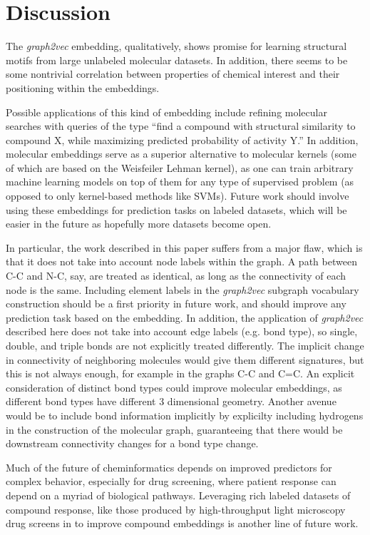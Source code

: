 \section{Discussion}

The \textit{graph2vec} embedding, qualitatively, shows promise for learning structural motifs from large unlabeled molecular datasets. In addition, there seems to be some nontrivial correlation between properties of chemical interest and their positioning within the embeddings.

Possible applications of this kind of embedding include refining molecular searches with queries of the type ``find a compound with structural similarity to compound X, while maximizing predicted probability of activity Y.'' In addition, molecular embeddings serve as a superior alternative to molecular kernels (some of which are based on the Weisfeiler Lehman kernel), as one can train arbitrary machine learning models on top of them for any type of supervised problem (as opposed to only kernel-based methods like SVMs). Future work should involve using these embeddings for prediction tasks on labeled datasets, which will be easier in the future as hopefully more datasets become open.

In particular, the work described in this paper suffers from a major flaw, which is that it does not take into account node labels within the graph. A path between C-C and N-C, say, are treated as identical, as long as the connectivity of each node is the same. Including element labels in the \textit{graph2vec} subgraph vocabulary construction should be a first priority in future work, and should improve any prediction task based on the embedding. In addition, the application of \textit{graph2vec} described here does not take into account edge labels (e.g. bond type), so single, double, and triple bonds are not explicitly treated differently. The implicit change in connectivity of neighboring molecules would give them different signatures, but this is not always enough, for example in the graphs C-C and C=C. An explicit consideration of distinct bond types could improve molecular embeddings, as different bond types have different 3 dimensional geometry. Another avenue would be to include bond information implicitly by explicilty including hydrogens in the construction of the molecular graph, guaranteeing that there would be downstream connectivity changes for a bond type change.

Much of the future of cheminformatics depends on improved predictors for complex behavior, especially for drug screening, where patient response can depend on a myriad of biological pathways. Leveraging rich labeled datasets of compound response, like those produced by high-throughput light microscopy drug screens in \citet{Kang2016} to improve compound embeddings is another line of future work.

